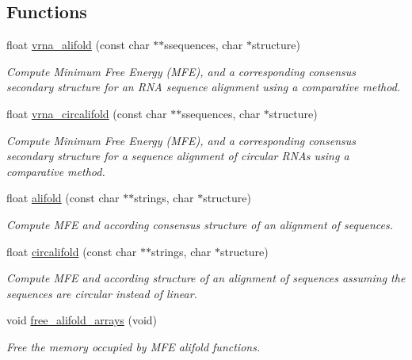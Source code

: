 \subsection*{Functions}
\begin{DoxyCompactItemize}
\item 
float \hyperlink{group__consensus__mfe__fold_ga02098d0c8790f9a37fbef6ad0cfc705c}{vrna\+\_\+alifold} (const char $\ast$$\ast$ssequences, char $\ast$structure)
\begin{DoxyCompactList}\small\item\em Compute Minimum Free Energy (M\+F\+E), and a corresponding consensus secondary structure for an R\+N\+A sequence alignment using a comparative method. \end{DoxyCompactList}\item 
float \hyperlink{group__consensus__mfe__fold_ga01ce2cff93ea44c4f4254760ca2bd16c}{vrna\+\_\+circalifold} (const char $\ast$$\ast$ssequences, char $\ast$structure)
\begin{DoxyCompactList}\small\item\em Compute Minimum Free Energy (M\+F\+E), and a corresponding consensus secondary structure for a sequence alignment of circular R\+N\+As using a comparative method. \end{DoxyCompactList}\item 
float \hyperlink{group__consensus__mfe__fold_ga4cf00f0659e5f0480335d69e797f05b1}{alifold} (const char $\ast$$\ast$strings, char $\ast$structure)
\begin{DoxyCompactList}\small\item\em Compute M\+F\+E and according consensus structure of an alignment of sequences. \end{DoxyCompactList}\item 
float \hyperlink{group__consensus__mfe__fold_gadbd3b0b1c144cbfb4efe704b2b260f96}{circalifold} (const char $\ast$$\ast$strings, char $\ast$structure)
\begin{DoxyCompactList}\small\item\em Compute M\+F\+E and according structure of an alignment of sequences assuming the sequences are circular instead of linear. \end{DoxyCompactList}\item 
void \hyperlink{group__consensus__mfe__fold_ga72095e4554b5d577250ea14c42acc49e}{free\+\_\+alifold\+\_\+arrays} (void)
\begin{DoxyCompactList}\small\item\em Free the memory occupied by M\+F\+E alifold functions. \end{DoxyCompactList}\end{DoxyCompactItemize}


